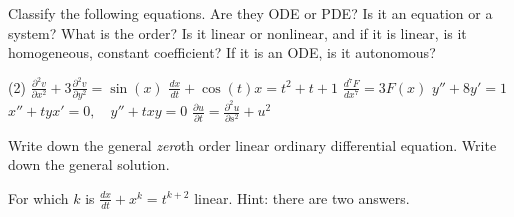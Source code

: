 \begin{exercise}
	Classify the following equations.  Are they ODE or PDE\@?  Is it an equation
	or a system?  What is the order?  Is it linear or nonlinear, and if it is
	linear, is it homogeneous, constant coefficient?  If it is an ODE\@, is it
	autonomous?
	\begin{tasks}(2)
		\task $\displaystyle \frac{\partial^2 v}{\partial x^2} + 3 \frac{\partial^2
			v}{\partial y^2} = \sin(x)$
		\task $\displaystyle \frac{d x}{dt} + \cos(t) x = t^2+t+1$
		\task $\displaystyle \frac{d^7 F}{dx^7} = 3F(x)$
		\task $\displaystyle y''+8y'=1$
		\task $\displaystyle x''+tyx'=0, \quad y''+txy = 0$
		\task $\displaystyle \frac{\partial u}{\partial t} = \frac{\partial^2 u}{\partial s^2} + u^2$
	\end{tasks}
\end{exercise}

\begin{exercise}
	Write down the general \emph{zero}th order linear ordinary differential
	equation.  Write down the general solution.
\end{exercise}

\begin{exercise}
	For which $k$ is $\frac{dx}{dt}+x^k = t^{k+2}$ linear.  Hint: there are two answers.
\end{exercise}
